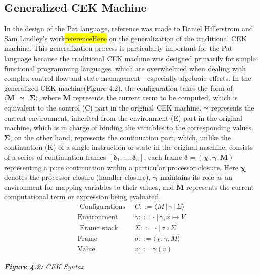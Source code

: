 \documentclass{l4proj}
\begin{document}
\subsection{Generalized CEK Machine}
In the design of the Pat language, reference was made to Daniel Hillerstrom and Sam Lindley's work\colorbox{yellow}{referenceHere} on the generalization of the traditional CEK machine. This generalization process is particularly important for the Pat language because the traditional CEK machine was designed primarily for simple functional programming languages, which are overwhelmed when dealing with complex control flow and state management---especially algebraic effects. In the generalized CEK machine(Figure 4.2), the configuration takes the form of $\langle \boldsymbol{M}\: |\: \boldsymbol{\gamma} \:| \:\boldsymbol{\Sigma} \rangle$, where $\boldsymbol{M}$ represents the current term to be computed, which is equivalent to the control (C) part in the original CEK machine. $\boldsymbol{\gamma}$ represents the current environment, inherited from the environment (E) part in the original machine, which is in charge of binding the variables to the corresponding values. $\boldsymbol{\Sigma}$, on the other hand, represents the continuation part, which, unlike the continuation (K) of a single instruction or state in the original machine, consists of a series of continuation frames $[\boldsymbol{\delta}_1, \ldots , \boldsymbol{\delta}_n]$, each frame $\boldsymbol{\delta} = (\boldsymbol{\chi}, \boldsymbol{\gamma}, \boldsymbol{M})$ representing a pure continuation within a particular processor closure. Here $\boldsymbol{\chi}$ denotes the processor closure (handler closure), $\boldsymbol{\gamma}$ maintains its role as an environment for mapping variables to their values, and $\boldsymbol{M}$ represents the current computational term or expression being evaluated. 
\begin{align*}
\text{ Configurations}\;\; & C ::= \langle M \, | \, \gamma \, | \, \Sigma \rangle \\
\text{Environment}\;\; & \gamma ::= \cdot \, | \, \gamma, x \mapsto V \\
\text{ Frame stack}\;\; & \Sigma ::= \cdot \, | \, \sigma \circ \Sigma \\
\text{Frame}\;\; & \sigma ::= \langle \chi, \gamma, M \rangle \\
\text{Value}\;\; & v ::= \gamma(v) 
\end{align*}
\begin{center}
\textit{\textbf{Figure 4.2:} CEK Syntax}
\end{center}
\end{document}
